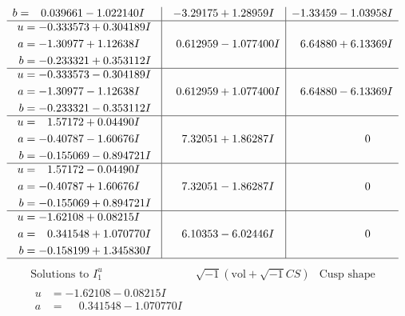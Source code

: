 \documentclass[1p]{elsarticle_modified}
\theoremstyle{definition}
\newcommand{\I}{\sqrt{-1}}
\begin{document}
$$\begin{array}{c|c|c}
\begin{aligned}
b &= \phantom{-}0.039661 - 1.022140 I\end{aligned}
 & -3.29175 + 1.28959 I & -1.33459 - 1.03958 I \\ \hline\begin{aligned}
u &= -0.333573 + 0.304189 I \\
a &= -1.30977 + 1.12638 I \\
b &= -0.233321 + 0.353112 I\end{aligned}
 & \phantom{-}0.612959 - 1.077400 I & \phantom{-}6.64880 + 6.13369 I \\ \hline\begin{aligned}
u &= -0.333573 - 0.304189 I \\
a &= -1.30977 - 1.12638 I \\
b &= -0.233321 - 0.353112 I\end{aligned}
 & \phantom{-}0.612959 + 1.077400 I & \phantom{-}6.64880 - 6.13369 I \\ \hline\begin{aligned}
u &= \phantom{-}1.57172 + 0.04490 I \\
a &= -0.40787 - 1.60676 I \\
b &= -0.155069 - 0.894721 I\end{aligned}
 & \phantom{-}7.32051 + 1.86287 I & \phantom{-0.000000 } 0 \\ \hline\begin{aligned}
u &= \phantom{-}1.57172 - 0.04490 I \\
a &= -0.40787 + 1.60676 I \\
b &= -0.155069 + 0.894721 I\end{aligned}
 & \phantom{-}7.32051 - 1.86287 I & \phantom{-0.000000 } 0 \\ \hline\begin{aligned}
u &= -1.62108 + 0.08215 I \\
a &= \phantom{-}0.341548 + 1.070770 I \\
b &= -0.158199 + 1.345830 I\end{aligned}
 & \phantom{-}6.10353 - 6.02446 I & \phantom{-0.000000 } 0\\
 \hline 
 \end{array}$$\newpage$$\begin{array}{c|c|c}  
\text{Solutions to }I^u_{1}& \I (\text{vol} + \sqrt{-1}CS) & \text{Cusp shape}\\
 \hline 
\begin{aligned}
u &= -1.62108 - 0.08215 I \\
a &= \phantom{-}0.341548 - 1.070770 I \\

\end{aligned}
\end{array}$$
\end{document}
